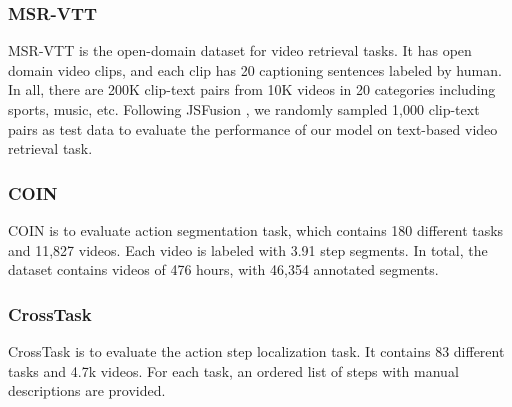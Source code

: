 \documentclass[11pt,a4paper]{article}
\begin{document}
	\subsubsection{MSR-VTT} MSR-VTT \cite{xu2016msr} is the open-domain dataset for video retrieval tasks. It has open domain video clips, and each clip has 20 captioning sentences labeled by human. In all, there are 200K clip-text pairs from 10K videos in 20 categories including sports, music, etc. Following JSFusion \cite{yu2018joint}, we randomly sampled 1,000 clip-text pairs as test data to evaluate the performance of our model on text-based video retrieval task.
	
	\subsubsection{COIN} COIN \cite{Tang2019COIN} is to evaluate action segmentation task, which contains 180 different tasks and 11,827 videos. Each video is labeled with 3.91 step segments. In total, the dataset contains videos of 476 hours, with 46,354 annotated segments. 
	
	\subsubsection{CrossTask} CrossTask \cite{Zhukov2019Cross} is to evaluate the action step localization task. It contains 83 different tasks and 4.7k videos. For each task, an ordered list of steps with manual descriptions are provided. 
	
\end{document}
